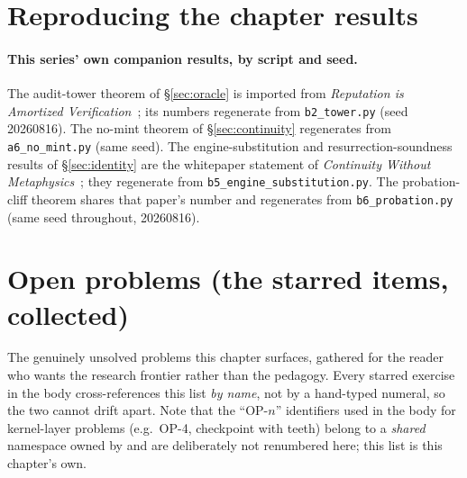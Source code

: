\documentclass[11pt,a4paper]{article}
\theoremstyle{definition}
\begin{document}
\section{Reproducing the chapter results}\label{sec:history}

\begin{sloppypar}
\paragraph{This series' own companion results, by script and seed.} The
audit-tower theorem of \S\ref{sec:oracle} is imported from \emph{Reputation is
Amortized Verification}~; its numbers regenerate from
\texttt{b2\_tower.py} (seed 20260816). The no-mint theorem of
\S\ref{sec:continuity} regenerates from \texttt{a6\_no\_mint.py} (same seed).
The engine-substitution and resurrection-soundness results of
\S\ref{sec:identity} are the whitepaper statement of \emph{Continuity Without
Metaphysics}~; they regenerate from
\texttt{b5\_engine\_substitution.py}. The probation-cliff theorem shares that
paper's number and regenerates from \texttt{b6\_probation.py} (same seed
throughout, 20260816).
\end{sloppypar}

\section{Open problems (the starred items, collected)}\label{sec:open}

The genuinely unsolved problems this chapter surfaces, gathered for the reader who
wants the research frontier rather than the pedagogy. Every starred exercise in the
body cross-references this list \emph{by name}, not by a hand-typed numeral, so the
two cannot drift apart. Note that the ``OP-$n$'' identifiers used in the body for
kernel-layer problems (e.g.\ OP-4, checkpoint with teeth) belong to a \emph{shared}
namespace owned by  and are deliberately
not renumbered here; this list is
this chapter's own.
\end{document}
